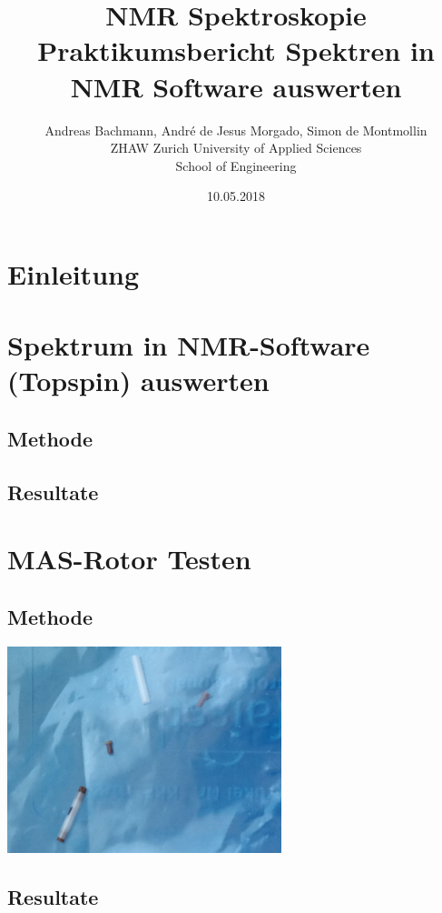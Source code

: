 \documentclass[a4paper]{article}
\title{NMR Spektroskopie Praktikumsbericht Spektren in NMR Software auswerten}
\author{Andreas Bachmann, André de Jesus Morgado, Simon de Montmollin
	\\
	ZHAW Zurich University of Applied Sciences\\
	School of Engineering
}
\date{10.05.2018}
\newenvironment{Figure}
	{\par\medskip\noindent\minipage{\linewidth}}
	{\endminipage\par\medskip}
\begin{document}
	\maketitle
	
	\begin{multicols*}{2}
		\section{Einleitung}
			\lipsum[1]
		
		\section{Spektrum in NMR-Software (Topspin) auswerten}
			\subsection{Methode}
				\lipsum[1]
				
			\subsection{Resultate}
				\lipsum[1]
				
		\section{MAS-Rotor Testen}
			\subsection{Methode}
				\lipsum[1]
			
				\begin{Figure}
					\centering
					\includegraphics[width=8cm]{images/IMG_20180417_163058_crop.jpg}
					\label{fig:xray}
				\end{Figure}
			
			\subsection{Resultate}
				\lipsum[1]
			

\end{multicols*}
\end{document}

